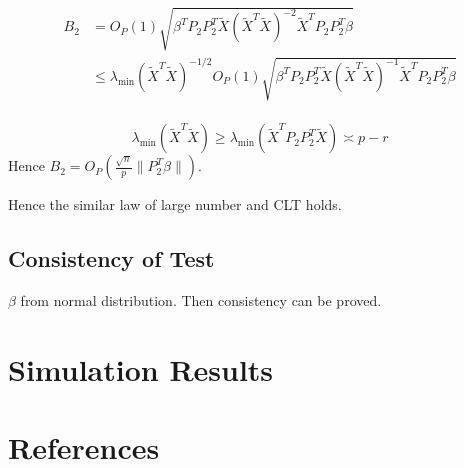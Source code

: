 \documentclass[review]{elsarticle}
\theoremstyle{plain}
\theoremstyle{definition}
\theoremstyle{remark}
\begin{document}
\begin{equation}
    \begin{aligned}
    B_2&=O_P(1)\sqrt{\beta^T P_2 P_2^T \tilde{X}{(\tilde{X}^T\tilde{X})}^{-2}\tilde{X}^T P_2 P_2^T \beta}\\
    &\leq \lambda_{\min}{(\tilde{X}^T\tilde{X})}^{-1/2}O_P(1)\sqrt{\beta^T P_2 P_2^T \tilde{X}{(\tilde{X}^T\tilde{X})}^{-1}\tilde{X}^T P_2 P_2^T \beta}\\
    \end{aligned}
\end{equation}

\begin{equation}
    \lambda_{\min}{(\tilde{X}^T\tilde{X})}\geq \lambda_{\min}{(\tilde{X}^T P_2 P_2^T \tilde{X})}\asymp p-r
\end{equation}
Hence $B_2=O_P(\frac{\sqrt{n}}{p}\|P_2^T \beta\|)$.

Hence the similar law of large number and CLT holds.

\subsection{Consistency of Test}
$\beta$ from normal distribution. Then consistency can be proved.

\section{Simulation Results}


\section*{References}

\end{document}
